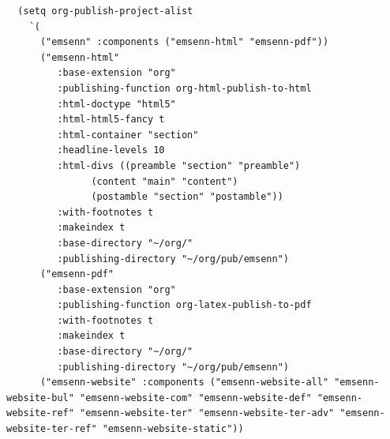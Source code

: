 \documentclass[11pt]{article}
\begin{document}
\begin{verbatim}
  (setq org-publish-project-alist
	`(
	  ("emsenn" :components ("emsenn-html" "emsenn-pdf"))
	  ("emsenn-html"
	     :base-extension "org"
	     :publishing-function org-html-publish-to-html
	     :html-doctype "html5"
	     :html-html5-fancy t
	     :html-container "section"
	     :headline-levels 10
	     :html-divs ((preamble "section" "preamble")
		       (content "main" "content")
		       (postamble "section" "postamble"))
	     :with-footnotes t
	     :makeindex t
	     :base-directory "~/org/"
	     :publishing-directory "~/org/pub/emsenn")
	  ("emsenn-pdf"
	     :base-extension "org"
	     :publishing-function org-latex-publish-to-pdf
	     :with-footnotes t
	     :makeindex t
	     :base-directory "~/org/"
	     :publishing-directory "~/org/pub/emsenn")
	  ("emsenn-website" :components ("emsenn-website-all" "emsenn-website-bul" "emsenn-website-com" "emsenn-website-def" "emsenn-website-ref" "emsenn-website-ter" "emsenn-website-ter-adv" "emsenn-website-ter-ref" "emsenn-website-static"))


\end{verbatim}
\end{document}
